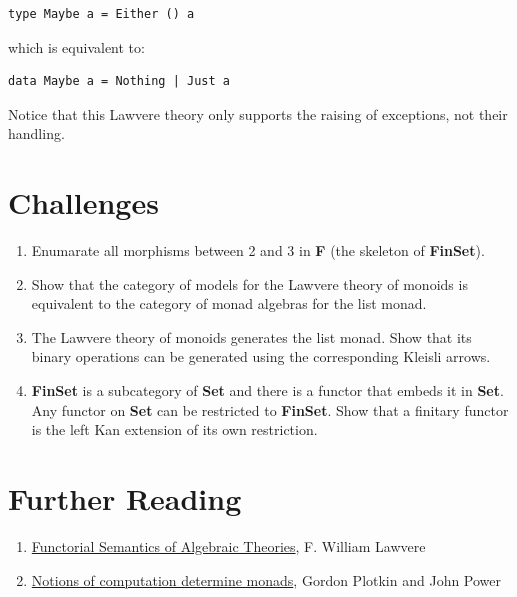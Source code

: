 \begin{Verbatim}[commandchars=\\\{\}]
type Maybe a = Either () a
\end{Verbatim}
which is equivalent to:

\begin{Verbatim}[commandchars=\\\{\}]
data Maybe a = Nothing | Just a
\end{Verbatim}
Notice that this Lawvere theory only supports the raising of exceptions,
not their handling.

\section{Challenges}\label{challenges}

\begin{enumerate}
\tightlist
\item
  Enumarate all morphisms between 2 and 3 in \textbf{F} (the skeleton of
  \textbf{FinSet}).
\item
  Show that the category of models for the Lawvere theory of monoids is
  equivalent to the category of monad algebras for the list monad.
\item
  The Lawvere theory of monoids generates the list monad. Show that its
  binary operations can be generated using the corresponding Kleisli
  arrows.
\item
  \textbf{FinSet} is a subcategory of \textbf{Set} and there is a
  functor that embeds it in \textbf{Set}. Any functor on \textbf{Set}
  can be restricted to \textbf{FinSet}. Show that a finitary functor is
  the left Kan extension of its own restriction.
\end{enumerate}

\section{Further Reading}\label{further-reading}
\begin{enumerate}
  \tightlist
  \item
  \href{http://www.tac.mta.ca/tac/reprints/articles/5/tr5.pdf}{Functorial Semantics of Algebraic Theories}, F. William Lawvere
  \item
  \href{http://homepages.inf.ed.ac.uk/gdp/publications/Comp_Eff_Monads.pdf}{Notions of computation determine monads}, Gordon Plotkin and John Power
\end{enumerate}